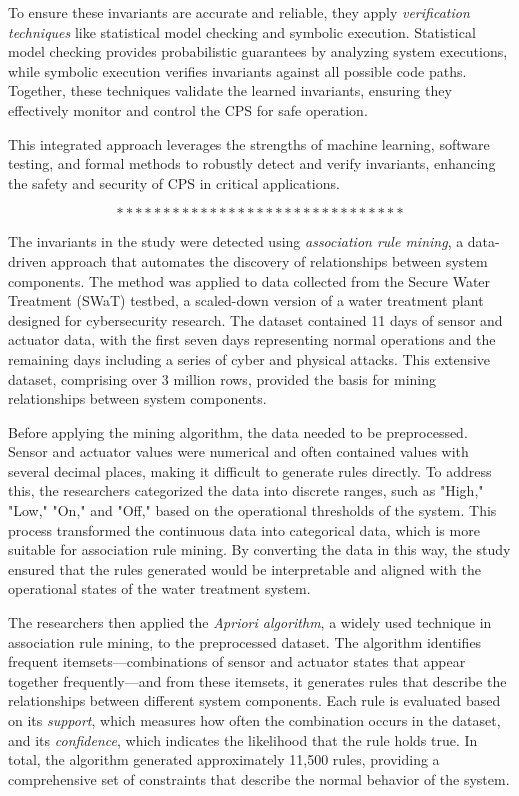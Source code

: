 To ensure these invariants are accurate and reliable, they apply \textit{verification techniques} like statistical model checking and symbolic execution. Statistical model checking provides probabilistic guarantees by analyzing system executions, while symbolic execution verifies invariants against all possible code paths. Together, these techniques validate the learned invariants, ensuring they effectively monitor and control the CPS for safe operation.

This integrated approach leverages the strengths of machine learning, software testing, and formal methods to robustly detect and verify invariants, enhancing the safety and security of CPS in critical applications\cite{24}.

$$*******************************$$

The invariants in the study were detected using \textit{association rule mining}, a data-driven approach that automates the discovery of relationships between system components. The method was applied to data collected from the Secure Water Treatment (SWaT) testbed, a scaled-down version of a water treatment plant designed for cybersecurity research. The dataset contained 11 days of sensor and actuator data, with the first seven days representing normal operations and the remaining days including a series of cyber and physical attacks. This extensive dataset, comprising over 3 million rows, provided the basis for mining relationships between system components.

Before applying the mining algorithm, the data needed to be preprocessed. Sensor and actuator values were numerical and often contained values with several decimal places, making it difficult to generate rules directly. To address this, the researchers categorized the data into discrete ranges, such as "High," "Low," "On," and "Off," based on the operational thresholds of the system. This process transformed the continuous data into categorical data, which is more suitable for association rule mining. By converting the data in this way, the study ensured that the rules generated would be interpretable and aligned with the operational states of the water treatment system.

The researchers then applied the \textit{Apriori algorithm}, a widely used technique in association rule mining, to the preprocessed dataset. The algorithm identifies frequent itemsets—combinations of sensor and actuator states that appear together frequently—and from these itemsets, it generates rules that describe the relationships between different system components. Each rule is evaluated based on its \textit{support}, which measures how often the combination occurs in the dataset, and its \textit{confidence}, which indicates the likelihood that the rule holds true. In total, the algorithm generated approximately 11,500 rules, providing a comprehensive set of constraints that describe the normal behavior of the system.

